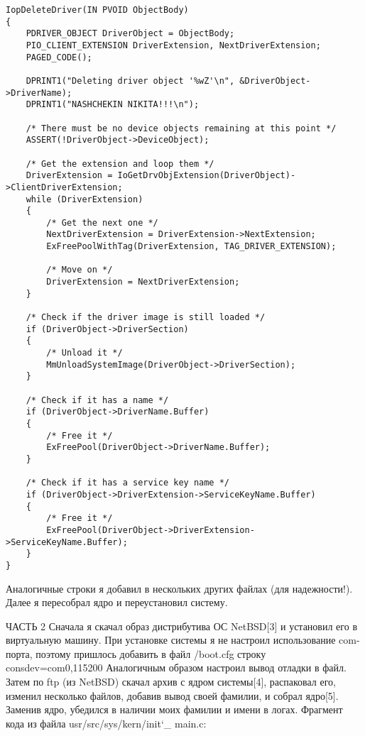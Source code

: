 \documentclass[a4paper, 14pt]{extarticle}
\begin{document}
\begin{verbatim}
IopDeleteDriver(IN PVOID ObjectBody)
{
    PDRIVER_OBJECT DriverObject = ObjectBody;
    PIO_CLIENT_EXTENSION DriverExtension, NextDriverExtension;
    PAGED_CODE();

    DPRINT1("Deleting driver object '%wZ'\n", &DriverObject->DriverName);
    DPRINT1("NASHCHEKIN NIKITA!!!\n");

    /* There must be no device objects remaining at this point */
    ASSERT(!DriverObject->DeviceObject);

    /* Get the extension and loop them */
    DriverExtension = IoGetDrvObjExtension(DriverObject)->ClientDriverExtension;
    while (DriverExtension)
    {
        /* Get the next one */
        NextDriverExtension = DriverExtension->NextExtension;
        ExFreePoolWithTag(DriverExtension, TAG_DRIVER_EXTENSION);

        /* Move on */
        DriverExtension = NextDriverExtension;
    }

    /* Check if the driver image is still loaded */
    if (DriverObject->DriverSection)
    {
        /* Unload it */
        MmUnloadSystemImage(DriverObject->DriverSection);
    }

    /* Check if it has a name */
    if (DriverObject->DriverName.Buffer)
    {
        /* Free it */
        ExFreePool(DriverObject->DriverName.Buffer);
    }

    /* Check if it has a service key name */
    if (DriverObject->DriverExtension->ServiceKeyName.Buffer)
    {
        /* Free it */
        ExFreePool(DriverObject->DriverExtension->ServiceKeyName.Buffer);
    }
}
\end{verbatim}

\begin{flushleft}
Аналогичные строки я добавил в нескольких других файлах (для надежности!). Далее я пересобрал ядро и переустановил систему. \newline

ЧАСТЬ 2 \newline
Сначала я скачал образ дистрибутива ОС NetBSD[3] и установил его в виртуальную машину. При установке системы я не настроил использование com-порта, поэтому пришлось добавить в файл /boot.cfg строку \newline 
consdev=com0,115200 \newline
Аналогичным образом настроил вывод отладки в файл. Затем по ftp (из NetBSD) скачал архив с ядром системы[4], распаковал его, изменил несколько файлов, добавив вывод своей фамилии, и собрал ядро[5]. Заменив ядро, убедился в наличии моих фамилии и имени в логах.
Фрагмент кода из файла usr/src/sys/kern/init\char`_ main.c:
\end{flushleft}
\end{document}
